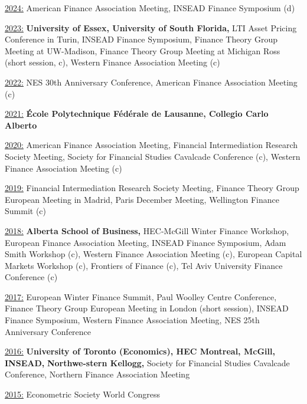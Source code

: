 \documentclass[11pt]{article}
\begin{document}
\underline{2024:} American Finance Association Meeting, INSEAD Finance Symposium (d)

\vspace{0.5em} %
\underline{2023:} \textbf{University of Essex, University of South Florida,} LTI Asset Pricing Conference in Turin, INSEAD Finance Symposium, Finance Theory Group Meeting at UW-Madison, Finance Theory Group Meeting at Michigan Ross (short session, c), Western Finance Association Meeting (c)

\vspace{0.5em}
\underline{2022:} NES 30th Anniversary Conference, American Finance Association Meeting (c)

\vspace{0.5em}
\underline{2021:} \textbf{École Polytechnique Fédérale de Lausanne, Collegio Carlo Alberto}

\vspace{0.5em}
\underline{2020:} American Finance Association Meeting, Financial Intermediation Research Society Meeting, Society for Financial Studies Cavalcade Conference (c), Western Finance Association Meeting (c)

\vspace{0.5em}
\underline{2019:} Financial Intermediation Research Society Meeting, Finance Theory Group European Meeting in Madrid, Paris December Meeting, Wellington Finance Summit (c)

\vspace{0.5em}
\underline{2018:} \textbf{Alberta School of Business,} HEC-McGill Winter Finance Workshop, European Finance Association Meeting, INSEAD Finance Symposium, Adam Smith Workshop (c), Western Finance Association Meeting (c), European Capital Markets Workshop (c), Frontiers of Finance (c), Tel Aviv University Finance Conference (c)

\vspace{0.5em}
\underline{2017:} European Winter Finance Summit, Paul Woolley Centre Conference, Finance Theory Group European Meeting in London (short session), INSEAD Finance Symposium, Western Finance Association Meeting, NES 25th Anniversary Conference

\vspace{0.5em}
\underline{2016:} \textbf{University of Toronto (Economics), HEC Montreal, McGill, INSEAD,}  \textbf{Northwe-stern Kellogg,} Society for Financial Studies Cavalcade Conference, Northern Finance Association Meeting

\vspace{0.5em}
\underline{2015:} Econometric Society World Congress
\end{document}
